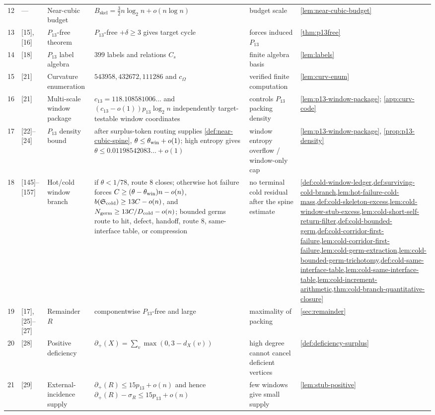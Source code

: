 \documentclass[11pt]{article}
\newcommand{\defp}{\partial_+}
\begin{document}
{\begin{longtable}{C{0.04\textwidth} L{0.13\textwidth} L{0.17\textwidth} L{0.25\textwidth} L{0.21\textwidth} L{0.12\textwidth}}
12 & --- & Near-cubic budget & $B_{\mathrm{skel}}=\frac32 n\log_2n+o(n\log n)$ & budget scale & \cref{lem:near-cubic-budget} \\
13 & [15], [16] & $P_{13}$-free theorem & $P_{13}$-free $+\delta\ge3$ gives target cycle & forces induced $P_{13}$ & \cref{thm:p13free} \\
14 & [18] & $P_{13}$ label algebra & $399$ labels and relations $C_s$ & finite algebra basis & \cref{lem:labels} \\
15 & [21] & Curvature enumeration & $543958,432672,111286$ and $c_\Omega$ & verified finite computation & \cref{lem:curv-enum} \\
16 & [21] & Multi-scale window package & $c_{13}=118.108581006\ldots$ and \((c_{13}-o(1))p_{13}\log_2 n\) independently target-testable window coordinates & controls $P_{13}$ packing density & \cref{lem:p13-window-package}; \cref{app:curv-code} \\
17 & [22]--[24] & $P_{13}$ density bound & after surplus-token routing supplies \cref{def:near-cubic-spine}, $\theta\le\theta_{\rm win}+o(1)$; high entropy gives $\theta\le0.01198542083\ldots+o(1)$ & window entropy overflow / window-only cap & \cref{lem:p13-window-package}, \cref{prop:p13-density} \\
18 & [145]--[157] & Hot/cold window branch & if \(\theta<1/78\), route 8 closes; otherwise hot failure forces \(C\ge(\theta-\theta_{\rm win})n-o(n)\), \(b(\mathfrak S_{\rm cold})\ge13C-o(n)\), and \(N_{\rm germ}\ge13C/D_{\rm cold}-o(n)\); bounded germs route to hit, defect, handoff, route 8, same-interface table, or compression & no terminal cold residual after the spine estimate & \cref{def:cold-window-ledger,def:surviving-cold-branch,lem:hot-failure-cold-mass,def:cold-skeleton-excess,lem:cold-window-stub-excess,lem:cold-short-self-return-filter,def:cold-bounded-germ,def:cold-corridor-first-failure,lem:cold-corridor-first-failure,lem:cold-germ-extraction,lem:cold-bounded-germ-trichotomy,def:cold-same-interface-table,lem:cold-same-interface-table,lem:cold-increment-arithmetic,thm:cold-branch-quantitative-closure} \\
19 & [17], [25]--[27] & Remainder $R$ & componentwise $P_{13}$-free and large & maximality of packing & \cref{sec:remainder} \\
20 & [28] & Positive deficiency & $\defp(X)=\sum_v\max(0,3-d_X(v))$ & high degree cannot cancel deficient vertices & \cref{def:deficiency-surplus} \\
21 & [29] & External-incidence supply & $\defp(R)\le15p_{13}+o(n)$ and hence $\defp(R)-\sigma_R\le15p_{13}+o(n)$ & few windows give small supply & \cref{lem:stub-positive} \\

\end{longtable}}
\end{document}
